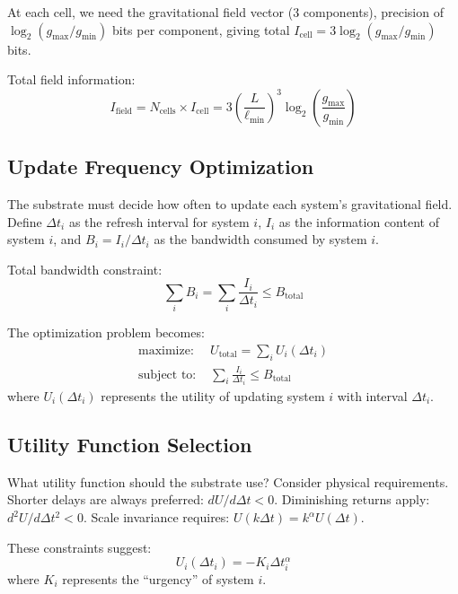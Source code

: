 \documentclass[twocolumn,prd,amsmath,amssymb,aps,superscriptaddress,nofootinbib]{revtex4-2}
\begin{document}
At each cell, we need the gravitational field vector (3 components), precision of $\log_2(g_{\text{max}}/g_{\text{min}})$ bits per component, giving total $I_{\text{cell}} = 3 \log_2(g_{\text{max}}/g_{\text{min}})$ bits.

Total field information:
\begin{equation}
I_{\text{field}} = N_{\text{cells}} \times I_{\text{cell}} = 3\left(\frac{L}{\ell_{\text{min}}}\right)^3 \log_2\left(\frac{g_{\text{max}}}{g_{\text{min}}}\right)
\end{equation}

\subsection{Update Frequency Optimization}

The substrate must decide how often to update each system's gravitational field. Define $\Delta t_i$ as the refresh interval for system $i$, $I_i$ as the information content of system $i$, and $B_i = I_i/\Delta t_i$ as the bandwidth consumed by system $i$.

Total bandwidth constraint:
\begin{equation}
\sum_i B_i = \sum_i \frac{I_i}{\Delta t_i} \leq B_{\text{total}}
\end{equation}

The optimization problem becomes:
\begin{align}
\text{maximize: } & U_{\text{total}} = \sum_i U_i(\Delta t_i) \\
\text{subject to: } & \sum_i \frac{I_i}{\Delta t_i} \leq B_{\text{total}}
\end{align}
where $U_i(\Delta t_i)$ represents the utility of updating system $i$ with interval $\Delta t_i$.

\subsection{Utility Function Selection}

What utility function should the substrate use? Consider physical requirements. Shorter delays are always preferred: $dU/d\Delta t < 0$. Diminishing returns apply: $d^2U/d\Delta t^2 < 0$. Scale invariance requires: $U(k\Delta t) = k^\alpha U(\Delta t)$.

These constraints suggest:
\begin{equation}
U_i(\Delta t_i) = -K_i \Delta t_i^\alpha
\end{equation}
where $K_i$ represents the ``urgency'' of system $i$.
\end{document}
